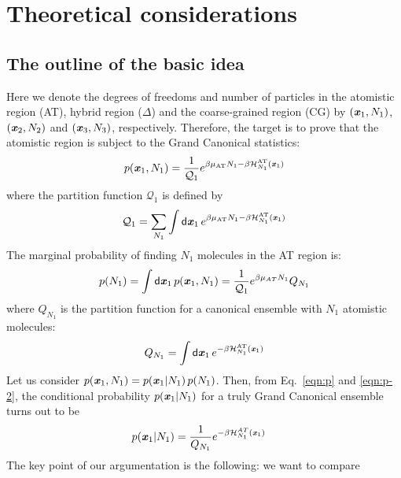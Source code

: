 \documentclass[aip,jcp,a4paper,reprint,onecolumn]{revtex4-1}
\newcommand{\vect}[1]{\textbf{\textit{#1}}}
\newcommand{\dd}[1]{\textsf{#1}}
\newcommand{\AT}{{\textrm{{AT}}}}
\newcommand{\HY}{{\Delta}}
\begin{document}
\section{Theoretical considerations}
\subsection{The outline of the basic idea}
Here we denote the degrees of freedoms and number of particles in the
atomistic region (AT), hybrid region ($\HY$) and the coarse-grained
region (CG) by $(\vect x_1, N_1)$, $(\vect x_2, N_2)$ and $(\vect x_3,
N_3)$, respectively. Therefore, the target is to prove that the atomistic
region is subject to the Grand Canonical statistics: 
\begin{align}\label{eqn:p}
  p(\vect x_1, N_1) = \frac{1}{\mathcal Q_1}
  e^{\beta\mu_{\AT} N_1 - \beta \mathcal H_{N_1}^{\AT}(\vect x_1)} 
\end{align}
where the partition function $\mathcal Q_1$ is defined by
\begin{align}
  \mathcal Q_1 =
  \sum_{N_1}\int
  \dd d\vect x_1\,
  e^{\beta\mu_{\AT} N_1 - \beta \mathcal H_{N_1}^{\AT}(\vect x_1)}
\end{align}
The marginal probability of finding $N_1$ molecules in the
AT region is:
\begin{align}\label{eqn:p-2}
  p(N_1) = \int\dd d\vect x_1\, p(\vect x_1, N_1)
  =
  \frac{1}{\mathcal Q_1}e^{\beta\mu_{AT} N_1}Q_{N_1}
\end{align}
where $Q_{N_1}$ is the partition function for a canonical ensemble
with $N_1$ atomistic molecules:
\begin{align}
  Q_{N_1}  =
  \int\dd d\vect x_1\,
  e^{ - \beta \mathcal H_{N_1}^{\AT}(\vect x_1)}
\end{align}
Let us consider
$p(\vect x_1, N_1) = p(\vect x_1 | N_1)\,p(N_1)$. Then,
from Eq.~\eqref{eqn:p} and \eqref{eqn:p-2},
the conditional probability $p(\vect x_1 | N_1)$
for a truly Grand Canonical ensemble turns out to be
\begin{align}\label{eqn:p-1}
  p(\vect x_1 | N_1) &= \frac{1}{Q_{N_1}} e^{-\beta \mathcal H_{N_1}^{AT}(\vect x_1)} \end{align}
The key point of our argumentation is the following: we want to compare
\end{document}
